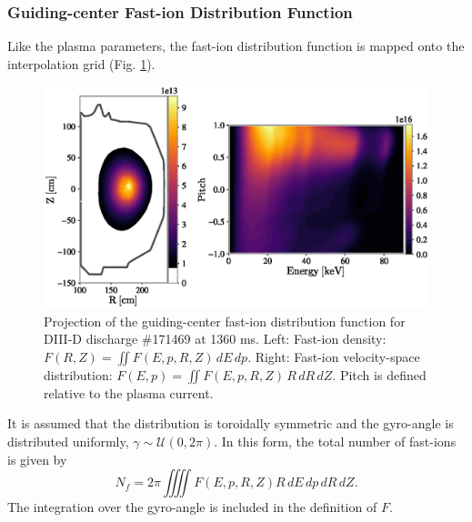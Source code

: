 \subsubsection{Guiding-center Fast-ion Distribution Function}
Like the plasma parameters, the fast-ion distribution function is mapped onto the interpolation grid (Fig. \ref{fig:fast_ion_distribution}). 
\begin{figure}
    \centering
    \includegraphics[width=13cm]{figures/fast_ion_distribution.eps}
    \caption{Projection of the guiding-center fast-ion distribution function for DIII-D discharge \#171469 at 1360 ms. Left: Fast-ion density: $F(R,Z)=\iint F(E,p,R,Z)\,dE\,dp$. Right: Fast-ion velocity-space distribution: $F(E,p)=\iint F(E,p,R,Z)\,R\,dR\,dZ$. Pitch is defined relative to the plasma current.}
    \label{fig:fast_ion_distribution}
\end{figure}
It is assumed that the distribution is toroidally symmetric and the gyro-angle is distributed uniformly, $\gamma \sim \mathcal{U}(0,2\pi)$.
In this form, the total number of fast-ions is given by
\begin{equation}\label{eq:f_ntot}
    N_{f} = 2\pi \iiiint F(E,p,R,Z) R\,dE\,dp\,dR\,dZ.
\end{equation}
The integration over the gyro-angle is included in the definition of $F$.

